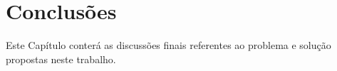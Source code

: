 \chapter{Conclusões}\label{chp:conclusoes}

Este Capítulo conterá as discussões finais referentes ao problema e solução propostas neste trabalho.